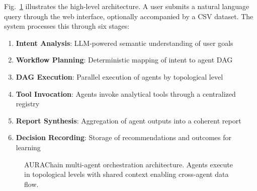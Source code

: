 \documentclass[conference]{IEEEtran}
\begin{document}
Fig.~\ref{fig:architecture} illustrates the high-level architecture. A user submits a natural language query through the web interface, optionally accompanied by a CSV dataset. The system processes this through six stages:

\begin{enumerate}
    \item \textbf{Intent Analysis}: LLM-powered semantic understanding of user goals
    \item \textbf{Workflow Planning}: Deterministic mapping of intent to agent DAG
    \item \textbf{DAG Execution}: Parallel execution of agents by topological level
    \item \textbf{Tool Invocation}: Agents invoke analytical tools through a centralized registry
    \item \textbf{Report Synthesis}: Aggregation of agent outputs into a coherent report
    \item \textbf{Decision Recording}: Storage of recommendations and outcomes for learning
\end{enumerate}

\begin{figure}[htbp]
\centering
{}
\caption{AURAChain multi-agent orchestration architecture. Agents execute in topological levels with shared context enabling cross-agent data flow.}
\label{fig:architecture}
\end{figure}
\end{document}

